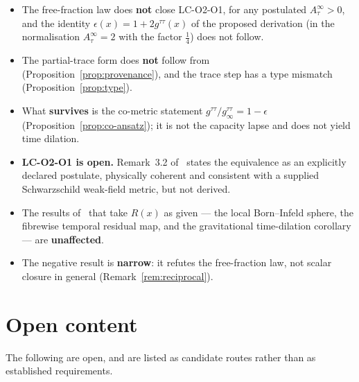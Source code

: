 \documentclass[12pt,a4paper]{article}
\theoremstyle{remark}
\theoremstyle{definition}
\begin{document}
    \begin{itemize}
      \item The free-fraction law does \textbf{not} close LC-O2-O1, for any postulated
        $A_{\tau}^{\infty}>0$, and the identity $\epsilon(x)=1+2g^{\tau\tau}(x)$ of the proposed derivation (in
        the normalisation $A_{\tau}^{\infty}=2$ with the factor $\tfrac14$) does not follow.
      \item The partial-trace form does \textbf{not} follow from~\cite{Beau2026w1}
        (Proposition~\ref{prop:provenance}), and the trace step has a type mismatch
        (Proposition~\ref{prop:type}).
      \item What \textbf{survives} is the co-metric statement
        $g^{\tau\tau}/g^{\tau\tau}_{\infty}=1-\epsilon$ (Proposition~\ref{prop:co-ansatz}); it is not
        the capacity lapse and does not yield time dilation.
      \item \textbf{LC-O2-O1 is open.} Remark~3.2 of~\cite{Beau2026lco2} states the equivalence as an
        explicitly declared postulate, physically coherent and consistent with a supplied Schwarzschild
        weak-field metric, but not derived.
      \item The results of~\cite{Beau2026lco2} that take $R(x)$ as given --- the local Born--Infeld
        sphere, the fibrewise temporal residual map, and the gravitational time-dilation corollary ---
        are \textbf{unaffected}.
      \item The negative result is \textbf{narrow}: it refutes the free-fraction law, not scalar
        closure in general (Remark~\ref{rem:reciprocal}).
    \end{itemize}

  \section{Open content}
    \label{sec:remaining}

    The following are open, and are listed as candidate routes rather than as established
    requirements.
\end{document}
